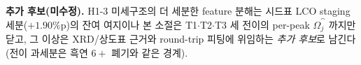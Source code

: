 \textbf{추가 후보(미수정).} H1-3 미세구조의 더 세분한 feature 분해는 시드표 LCO staging 세분($+1.90$\%p)의
잔여 여지이나 본 소절은 T1$\cdot$T2$\cdot$T3 세 전이의 per-peak $\Omega_j^\cat$ 까지만 닫고, 그 이상은 XRD/상도표
근거와 round-trip 피팅에 위임하는 \emph{추가 후보}로 남긴다(전이 과세분은 흑연 $6+$ 폐기와 같은 경계).


